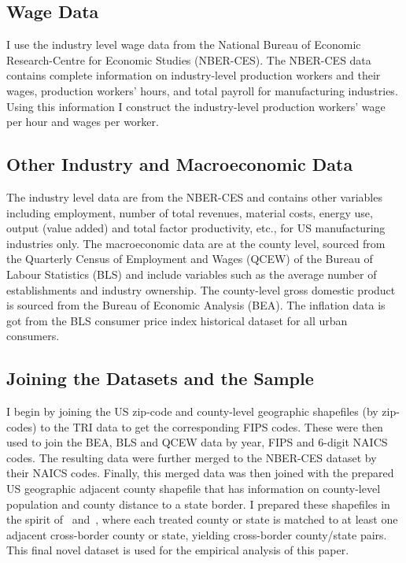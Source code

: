 \documentclass[authoryear, preprint, twocolumn, 1p]{elsarticle}
\begin{document}
    \subsection{Wage Data}\label{subsec:wage-data}
    I use the industry level wage data from the National Bureau of Economic Research-Centre for Economic Studies (NBER-CES). The NBER-CES data contains complete information on industry-level production workers and their wages, production workers' hours, and total payroll for manufacturing industries. Using this information I construct the industry-level production workers' wage per hour and wages per worker.

    \subsection{Other Industry and Macroeconomic Data}\label{subsec:other-industry-and-macroeconomic-data}
    The industry level data are from the NBER-CES and contains other variables including employment, number of total revenues, material costs, energy use, output (value added) and total factor productivity, etc., for US manufacturing industries only. The macroeconomic data are at the county level, sourced from the Quarterly Census of Employment and Wages (QCEW) of the Bureau of Labour Statistics (BLS) and include variables such as the average number of establishments and industry ownership. The county-level gross domestic product is sourced from the Bureau of Economic Analysis (BEA). The inflation data is got from the BLS consumer price index historical dataset for all urban consumers.

    \subsection{Joining the Datasets and the Sample}\label{subsec:joining-the-datasets-and-the-sample}
    I begin by joining the US zip-code and county-level geographic shapefiles (by zip-codes) to the TRI data to get the corresponding FIPS codes. These were then used to join the BEA, BLS and QCEW data by year, FIPS and $6$-digit NAICS codes. The resulting data were further merged to the NBER-CES dataset by their NAICS codes. Finally, this merged data was then joined with the prepared US geographic adjacent county shapefile that has information on county-level population and county distance to a state border. I prepared these shapefiles in the spirit of~\citet{dube2010minimum} and~\citet{gopalan2021state}, where each treated county or state is matched to at least one adjacent cross-border county or state, yielding cross-border county/state pairs. This final novel dataset is used for the empirical analysis of this paper.
\end{document}
